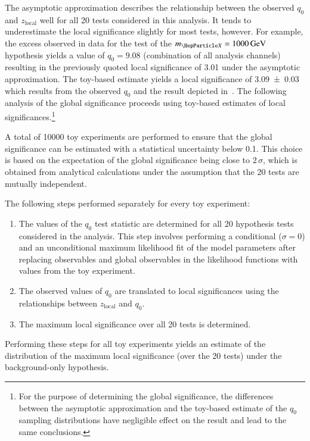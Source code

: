 The asymptotic approximation describes the relationship between the observed
$q_0$ and $z_{\text{local}}$ well for all 20 tests considered in this
analysis. It tends to underestimate the local significance slightly for most
tests, however. For example, the excess observed in data for the test of the
$\mX = \SI{1000}{\GeV}$ hypothesis yields a value of $q_0 = \num{9.08}$
(combination of all analysis channels) resulting in the previously quoted local
significance of \num{3.01} under the asymptotic approximation. The toy-based
estimate yields a local significance of \num{3.09 +- 0.03} which results from
the observed $q_0$ and the result depicted
in~. The following analysis of the global
significance proceeds using toy-based estimates of local
significances.\footnote{For the purpose of determining the global significance,
  the differences between the asymptotic approximation and the toy-based
  estimate of the $q_0$ sampling distributions have negligible effect on the
  result and lead to the same conclusions.}

A total of \num{10000} toy experiments are performed to ensure that the global
significance can be estimated with a statistical uncertainty below
\num{0.1}. This choice is based on the expectation of the global significance
being close to $2\,\sigma$, which is obtained from analytical calculations under
the assumption that the 20 tests are mutually independent.

The following steps performed separately for every toy experiment:
\begin{enumerate}

\item The values of the $q_0$ test statistic are determined for all 20
  hypothesis tests considered in the analysis. This step involves performing a
  conditional ($\sigma = 0$) and an unconditional maximum likelihood fit of the
  model parameters after replacing observables and global observables in the
  likelihood functions with values from the toy experiment.

\item The observed values of $q_0$ are translated to local significances using
  the relationships between $z_{\text{local}}$ and $q_0$.

\item The maximum local significance over all 20 tests is determined.

\end{enumerate}
Performing these steps for all toy experiments yields an estimate of the
distribution of the maximum local significance (over the 20 tests) under the
background-only hypothesis.

